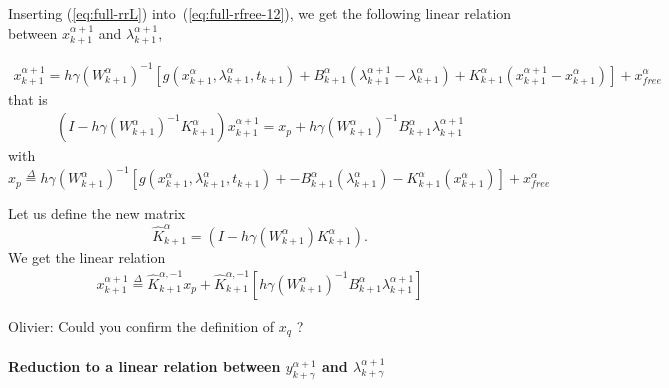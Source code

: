 Inserting (\ref{eq:full-rrL}) into~(\ref{eq:full-rfree-12}), we get the following linear relation between $x^{\alpha+1}_{k+1}$ and
$\lambda^{\alpha+1}_{k+1}$, 

\begin{equation}
   \begin{array}{l}
     x^{\alpha+1}_{k+1} = h\gamma(W^{\alpha}_{k+1} )^{-1}\left[g(x^{\alpha}_{k+1},\lambda^{\alpha}_{k+1},t_{k+1}) +
    B^{\alpha}_{k+1} (\lambda^{\alpha+1}_{k+1} - \lambda^{\alpha}_{k+1})+K^{\alpha}_{k+1}
    (x^{\alpha+1}_{k+1} - x^{\alpha}_{k+1}) \right ] +x^\alpha_{free}
\end{array}
\end{equation}
that is 
\begin{equation}
  \begin{array}{l}
    (I-h \gamma (W^{\alpha}_{k+1})^{-1}K^{\alpha}_{k+1})x^{\alpha+1}_{k+1}=x_p + h \gamma (W^{\alpha}_{k+1})^{-1}    B^{\alpha}_{k+1} \lambda^{\alpha+1}_{k+1}
   \end{array}
\end{equation}
with 
\begin{equation}
  \boxed{x_p \stackrel{\Delta}{=}  h\gamma(W^{\alpha}_{k+1} )^{-1}\left[g(x^{\alpha}_{k+1},\lambda^{\alpha}_{k+1},t_{k+1}) +
    -B^{\alpha}_{k+1} (\lambda^{\alpha}_{k+1})-K^{\alpha}_{k+1} (x^{\alpha}_{k+1}) \right ] +x^\alpha_{free}}
\end{equation}



Let us  define the new matrix
\begin{equation}
\hat K^{\alpha}_{k+1}=(I-h \gamma (W^{\alpha}_{k+1})K^{\alpha}_{k+1}).
\label{eq:full-hatW}
\end{equation}
We get the linear relation
\begin{equation}
  \label{eq:full-rfree-13}
  \begin{array}{l}
 \boxed{   x^{\alpha+1}_{k+1}\stackrel{\Delta}{=} \hat K^{\alpha,-1}_{k+1} x_p + \hat K^{\alpha,-1}_{k+1} \left[ h \gamma (W^{\alpha}_{k+1})^{-1}    B^{\alpha}_{k+1} \lambda^{\alpha+1}_{k+1}\right]}
   \end{array}
\end{equation}


\begin{ndrva}
  Olivier: Could you confirm the definition of $x_q$ ?
\end{ndrva}




\paragraph{Reduction to a linear relation between  $y^{\alpha+1}_{k+\gamma}$ and
$\lambda^{\alpha+1}_{k+\gamma}$}

